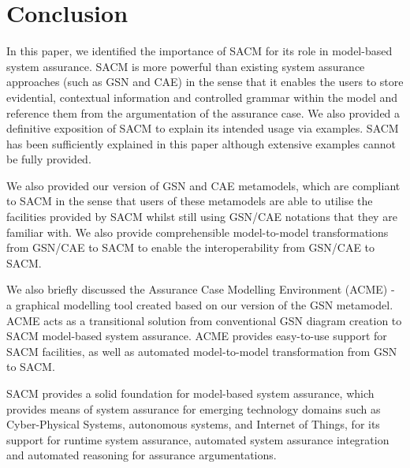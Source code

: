 \section{Conclusion}
\label{sec:conclusion}
In this paper, we identified the importance of SACM for its role in model-based system assurance. 
SACM is more powerful than existing system assurance approaches (such as GSN and CAE) in the sense that it enables the users to store evidential, contextual information and controlled grammar within the model and reference them from the argumentation of the assurance case. 
We also provided a definitive exposition of SACM to explain its intended usage via examples. 
SACM has been sufficiently explained in this paper although extensive examples cannot be fully provided.

We also provided our version of GSN and CAE metamodels, which are compliant to SACM in the sense that users of these metamodels are able to utilise the facilities provided by SACM whilst still using GSN/CAE notations that they are familiar with. 
We also provide comprehensible model-to-model transformations from GSN/CAE to SACM to enable the interoperability from GSN/CAE to SACM. 

We also briefly discussed the Assurance Case Modelling Environment (ACME) - a graphical modelling tool created based on our version of the GSN metamodel. 
ACME acts as a transitional solution from conventional GSN diagram creation to SACM model-based system assurance. ACME provides easy-to-use support for SACM facilities, as well as automated model-to-model transformation from GSN to SACM. 

SACM provides a solid foundation for model-based system assurance, which provides means of system assurance for emerging technology domains such as Cyber-Physical Systems, autonomous systems, and Internet of Things, for its support for runtime system assurance, automated system assurance integration and automated reasoning for assurance argumentations.\\


